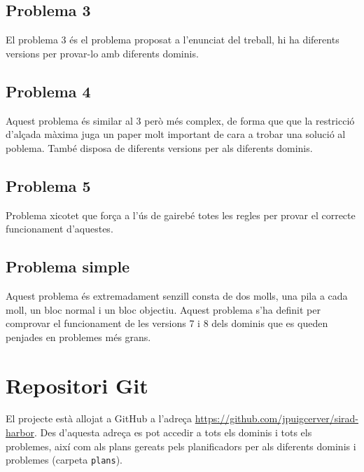 \documentclass[10pt,a4paper]{article}
\begin{document}
\subsection*{Problema 3}
El problema 3 és el problema proposat a l'enunciat del treball, hi ha diferents versions per provar-lo amb diferents dominis.

\subsection*{Problema 4}
Aquest problema és similar al 3 però més complex, de forma que que la restricció d'alçada màxima juga un paper
molt important de cara a trobar una solució al poblema. També disposa de diferents versions per als diferents dominis.

\subsection*{Problema 5}
Problema xicotet que força a l'ús de gairebé totes les regles per provar el correcte funcionament d'aquestes.

\subsection*{Problema simple}
Aquest problema és extremadament senzill consta de dos molls, una pila a cada moll, un bloc normal i un bloc objectiu. Aquest
problema s'ha definit per comprovar el funcionament de les versions 7 i 8 dels dominis que es queden penjades en problemes
més grans.


\section*{Repositori Git}
El projecte està allojat a GitHub a l'adreça \url{https://github.com/jpuigcerver/sirad-harbor}.
Des d'aquesta adreça es pot accedir a tots els dominis i tots els problemes, així com als plans
gereats pels planificadors per als diferents dominis i problemes (carpeta \texttt{plans}).
\end{document}
